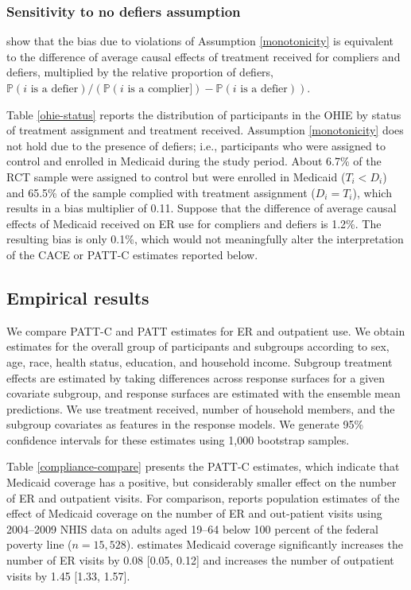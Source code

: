 \documentclass[hidelinks,12pt]{article}
\newcommand{\pr}{\mathbb{P}} %
\begin{document}
\subsubsection{Sensitivity to no defiers assumption} \label{sens-defiers}

\citet{Angrist1996} show that the bias due to violations of Assumption \eqref{monotonicity} is equivalent to the difference of average causal effects of treatment received for compliers and defiers, multiplied by the relative proportion of defiers, 
$\pr(i\text{ is a defier}) / (\pr(i\text{ is a complier]}) - \pr(i\text{ is a defier})).$

Table \ref{ohie-status} reports the distribution of participants in the OHIE by status of treatment assignment and treatment received. Assumption \eqref{monotonicity} does not hold due to the presence of defiers; i.e., participants who were assigned to control and enrolled in Medicaid during the study period. About 6.7\% of the RCT sample were assigned to control but were enrolled in Medicaid ($T_i < D_i$) and 65.5\% of the sample complied with treatment assignment ($D_i = T_i$), which results in a bias multiplier of 0.11. Suppose that the difference of average causal effects of Medicaid received on ER use for compliers and defiers is 1.2\%. The resulting bias is only 0.1\%, which would not meaningfully alter the interpretation of the CACE or PATT-C estimates reported below. 
 
\subsection{Empirical results}\label{results}

We compare PATT-C and PATT estimates for ER and outpatient use. We obtain estimates for the overall group of participants and subgroups according to sex, age, race, health status, education, and household income. Subgroup treatment effects are estimated by taking differences across response surfaces for a given covariate subgroup, and response surfaces are estimated with the ensemble mean predictions. We use treatment received, number of household members, and the subgroup covariates as features in the response models. We generate 95\% confidence intervals for these estimates using 1,000 bootstrap samples. 

Table \ref{compliance-compare} presents the PATT-C estimates, which indicate that Medicaid coverage has a positive, but considerably smaller effect on the number of ER and outpatient visits. For comparison, \citet{finkelstein2012} reports population estimates of the effect of Medicaid coverage on the number of ER and out-patient visits using 2004--2009 NHIS data on adults aged 19--64 below 100 percent of the federal poverty line ($n=15,528$). \citet{finkelstein2012} estimates Medicaid coverage significantly increases the number of ER visits by 0.08 [0.05, 0.12] and increases the number of outpatient visits by 1.45 [1.33, 1.57]. 
\end{document}
